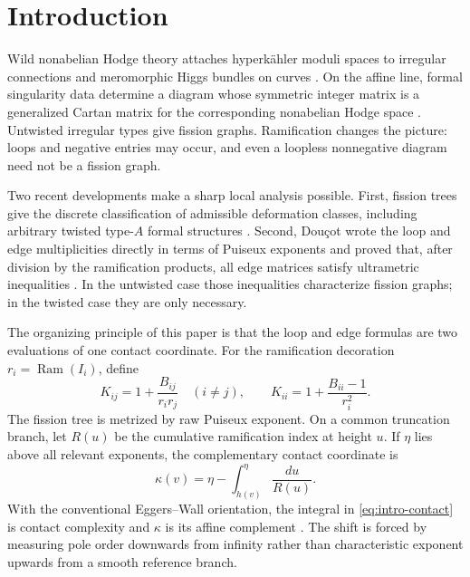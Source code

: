 \documentclass[11pt,a4paper]{amsart}
\theoremstyle{plain}
\theoremstyle{definition}
\newcommand{\Ram}{\operatorname{Ram}}
\begin{document}
\maketitle

\section{Introduction}\label{sec:intro}

Wild nonabelian Hodge theory attaches hyperk\"ahler moduli spaces to irregular connections and
meromorphic Higgs bundles on curves \cite{BiquardBoalch2004}.  On the affine line, formal
singularity data determine a diagram whose symmetric integer matrix is a generalized Cartan matrix
for the corresponding nonabelian Hodge space \cite{BoalchYamakawa2020}.  Untwisted irregular types
give fission graphs.  Ramification changes the picture: loops and negative entries may occur, and
even a loopless nonnegative diagram need not be a fission graph.

Two recent developments make a sharp local analysis possible.  First, fission trees give the
discrete classification of admissible deformation classes, including arbitrary twisted type-$A$
formal structures \cite{BoalchDoucotRembado2025}.  Second, Dou\c cot wrote the loop and edge
multiplicities directly in terms of Puiseux exponents and proved that, after division by the
ramification products, all edge matrices satisfy ultrametric inequalities
\cite{Doucot2025Graphs}.  In the untwisted case those inequalities characterize fission graphs; in
the twisted case they are only necessary.

The organizing principle of this paper is that the loop and edge formulas are two evaluations of
one contact coordinate.  For the ramification decoration $r_i=\Ram(I_i)$, define
\begin{equation}\label{eq:intro-K}
 K_{ij}=1+\frac{B_{ij}}{r_ir_j}\quad(i\ne j),\qquad
 K_{ii}=1+\frac{B_{ii}-1}{r_i^2}.
\end{equation}
The fission tree is metrized by raw Puiseux exponent.  On a common truncation branch, let $R(u)$
be the cumulative ramification index at height $u$.  If $\eta$ lies above all relevant exponents,
the complementary contact coordinate is
\begin{equation}\label{eq:intro-contact}
 \kappa(v)=\eta-\int_{h(v)}^\eta\frac{du}{R(u)}.
\end{equation}
With the conventional Eggers--Wall orientation, the integral in
\eqref{eq:intro-contact} is contact complexity and $\kappa$ is its affine complement
\cite{GarciaBarrosoGonzalezPopescu2019}.  The shift is forced by measuring pole order downwards
from infinity rather than characteristic exponent upwards from a smooth reference branch.
\end{document}
